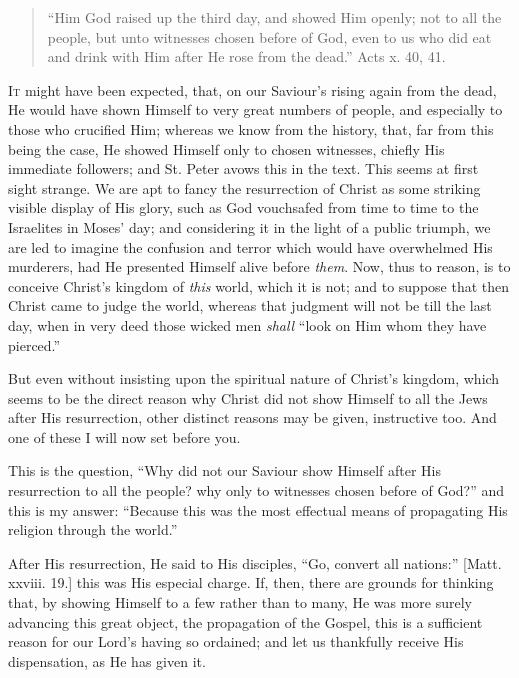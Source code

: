 
\begin{quote}

``Him God raised up the third day, and showed
Him openly; not to all the people, but unto witnesses
chosen before of God, even to us who did eat and
drink with Him after He rose from the dead.''
Acts x. 40, 41.

\end{quote}

I\textsc{t} might have been expected, that, on our Saviour's
rising again from the dead, He would have shown Himself
to very great numbers of people, and especially to those
who crucified Him; whereas we know from the history,
that, far from this being the case, He showed Himself
only to chosen witnesses, chiefly His immediate
followers; and St. Peter avows this in the text. This
seems at first sight strange. We are apt to fancy the
resurrection of Christ as some striking visible display
of His glory, such as God vouchsafed from time to time to
the Israelites in Moses' day; and considering it in the
light of a public triumph, we are led to imagine the
confusion and terror which would have overwhelmed His
murderers, had He presented Himself alive before \emph{them}.
Now, thus to reason, is to conceive Christ's kingdom of \emph{this}
world, which it is not; and to suppose that then Christ
came to judge the world, whereas that judgment will not
be till the last day, when in very deed those wicked men \emph{shall}
``look on Him whom they have pierced.''

But even without insisting upon the spiritual nature
of Christ's kingdom, which seems to be the direct reason
why Christ did not show Himself to all the Jews after His
resurrection, other distinct reasons may be given,
instructive too. And one of these I will now set before
you.

This is the question, ``Why did not our Saviour
show Himself after His resurrection to all the people?
why only to witnesses chosen before of God?'' and
this is my answer: ``Because this was the most
effectual means of propagating His religion through the
world.''

After His resurrection, He said to His disciples,
``Go, convert all nations:'' [Matt. xxviii. 19.]
this was His especial charge. If, then, there are grounds
for thinking that, by showing Himself to a few rather
than to many, He was more surely advancing this great
object, the propagation of the Gospel, this is a
sufficient reason for our Lord's having so ordained; and
let us thankfully receive His dispensation, as He has
given it.

